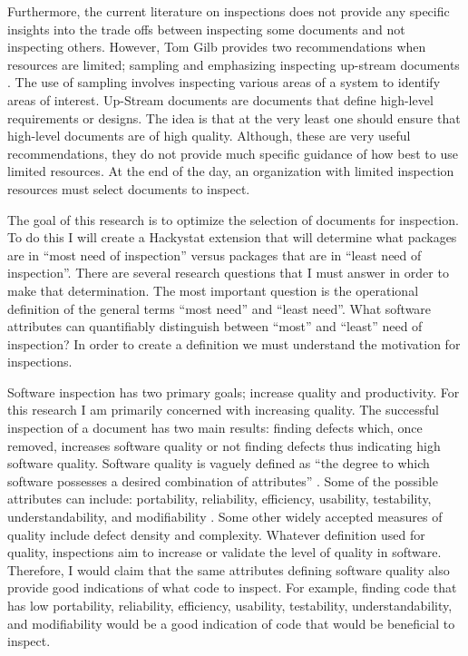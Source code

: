 \documentclass[11pt,twocolumn]{article}
\begin{document}
Furthermore, the current literature \cite{Ebenau94} \cite{Wiegers02}
\cite{Gilb93} on inspections does not provide any specific insights into
the trade offs between inspecting some documents and not inspecting others.
However, Tom Gilb provides two recommendations when resources are limited;
sampling and emphasizing inspecting up-stream documents \cite{Gilb93}. The
use of sampling involves inspecting various areas of a system to identify
areas of interest. Up-Stream documents are documents that define high-level
requirements or designs. The idea is that at the very least one should
ensure that high-level documents are of high quality. Although, these are
very useful recommendations, they do not provide much specific guidance of
how best to use limited resources. At the end of the day, an organization
with limited inspection resources must select documents to inspect. 

The goal of this research is to optimize the selection of documents for
inspection. To do this I will create a Hackystat extension that will
determine what packages are in ``most need of inspection'' versus packages
that are in ``least need of inspection''. There are several research
questions that I must answer in order to make that determination. The most
important question is the operational definition of the general terms
``most need'' and ``least need''. What software attributes can quantifiably
distinguish between ``most'' and ``least'' need of inspection? In order to
create a definition we must understand the motivation for inspections.

Software inspection has two primary goals; increase quality and
productivity. For this research I am primarily concerned with increasing
quality. The successful inspection of a document has two main results:
finding defects which, once removed, increases software quality or not
finding defects thus indicating high software quality. Software quality is
vaguely defined as ``the degree to which software possesses a desired
combination of attributes'' \cite{IEEEGlossary83}. Some of the possible
attributes can include: portability, reliability, efficiency, usability,
testability, understandability, and modifiability \cite{Glass03}. Some
other widely accepted measures of quality include defect density and
complexity.  Whatever definition used for quality, inspections aim to
increase or validate the level of quality in software. Therefore, I would
claim that the same attributes defining software quality also provide good
indications of what code to inspect. For example, finding code that has low
portability, reliability, efficiency, usability, testability,
understandability, and modifiability would be a good indication of code
that would be beneficial to inspect.
\end{document}
